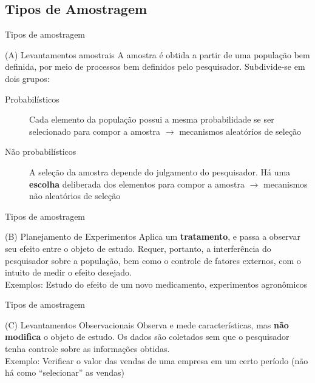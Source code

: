 \documentclass[10pt]{beamer}
\theoremstyle{definition}
\begin{document}
\subsection[Tipos]{Tipos de Amostragem}

\begin{frame}{Tipos de amostragem}
  \begin{block}{(A) Levantamentos amostrais}
    A amostra é obtida a partir de uma população bem definida, por meio
    de processos bem definidos pelo pesquisador. Subdivide-se em dois
    grupos:
    \begin{description}
    \item[Probabilísticos] Cada elemento da população possui a
    mesma probabilidade se ser selecionado para compor a amostra
    $\rightarrow$ mecanismos aleatórios de seleção
  \item[Não probabilísticos] A seleção da amostra depende do julgamento
    do pesquisador. Há uma \textbf{escolha} deliberada dos elementos
    para compor a amostra $\rightarrow$ mecanismos não aleatórios de
    seleção
    \end{description}
  \end{block}
\end{frame}

\begin{frame}{Tipos de amostragem}
  \begin{block}{(B) Planejamento de Experimentos}
    Aplica um \textbf{tratamento}, e passa a observar seu efeito entre
    o objeto de estudo. Requer, portanto, a interferência do pesquisador
    sobre a população, bem como o controle de fatores externos, com o
    intuito de medir o efeito desejado.\\
    \vspace{1em}
    Exemplos: Estudo do efeito de um novo medicamento, experimentos
    agronômicos
  \end{block}
\end{frame}

\begin{frame}{Tipos de amostragem}
  \begin{block}{(C) Levantamentos Observacionais}
    Observa e mede características, mas \textbf{não modifica} o objeto
    de estudo. Os dados são coletados sem que o pesquisador tenha
    controle sobre as informações obtidas. \\
    \vspace{1em}
    Exemplo: Verificar o valor das vendas de uma empresa em um certo
    período (não há como ``selecionar'' as vendas)
  \end{block}
\end{frame}
\end{document}
